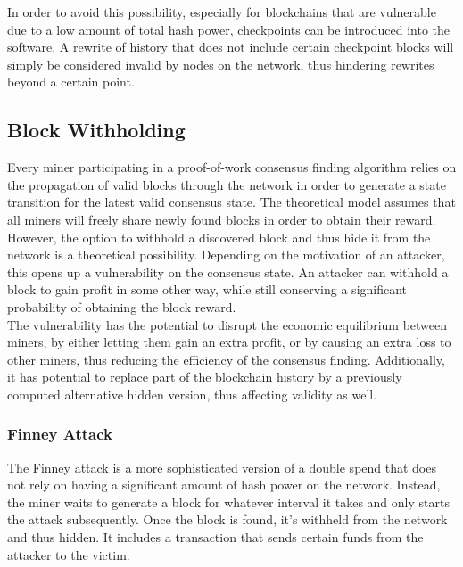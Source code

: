 \documentclass[11pt,a4paper,draft]{article}
\begin{document}
In order to avoid this possibility, especially for blockchains that are vulnerable due to a low amount of total hash power, checkpoints can be introduced into the software. A rewrite of history that does not include certain checkpoint blocks will simply be considered invalid by nodes on the network, thus hindering rewrites beyond a certain point.\\


\subsection{Block Withholding}

Every miner participating in a proof-of-work consensus finding algorithm relies on the propagation of valid blocks through the network in order to generate a state transition for the latest valid consensus state. The theoretical model assumes that all miners will freely share newly found blocks in order to obtain their reward.\\

However, the option to withhold a discovered block and thus hide it from the network is a theoretical possibility. Depending on the motivation of an attacker, this opens up a vulnerability on the consensus state. An attacker can withhold a block to gain profit in some other way, while still conserving a significant probability of obtaining the block reward.\\

The vulnerability has the potential to disrupt the economic equilibrium between miners, by either letting them gain an extra profit, or by causing an extra loss to other miners, thus reducing the efficiency of the consensus finding. Additionally, it has potential to replace part of the blockchain history by a previously computed alternative hidden version, thus affecting validity as well.\\

\subsubsection{Finney Attack}

The Finney attack is a more sophisticated version of a double spend that does not rely on having a significant amount of hash power on the network. Instead, the miner waits to generate a block for whatever interval it takes and only starts the attack subsequently. Once the block is found, it's withheld from the network and thus hidden. It includes a transaction that sends certain funds from the attacker to the victim.\\
\end{document}
